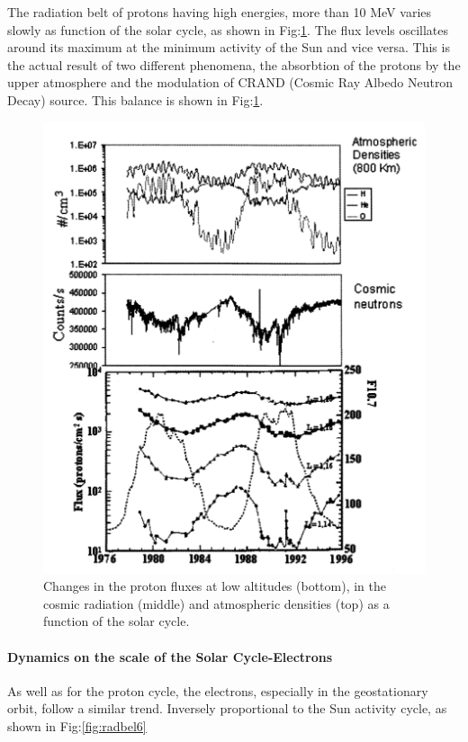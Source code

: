 \documentclass[./dissertation.tex]{subfiles}
\begin{document}
The radiation belt of protons having high energies, more than 10 MeV varies slowly as function of the solar cycle, as shown in Fig:\ref{fig:radbel5}. The flux levels oscillates around its maximum at the minimum activity of the Sun and vice versa. This is the actual result of two different phenomena, the absorbtion of the protons by the upper atmosphere and the modulation of CRAND (Cosmic Ray Albedo Neutron Decay) source. This balance is shown in Fig:\ref{fig:radbel5}.



\begin{figure}[h!]
\centering
  \includegraphics[scale = 0.50]{imgs/radbelt5.png}
  \caption{Changes in the proton fluxes at low altitudes (bottom), in the cosmic radiation (middle) and atmospheric densities (top) as a function of the solar cycle. \cite{bib2}}
  \label{fig:radbel5}
\end{figure}

\paragraph{Dynamics on the scale of the Solar Cycle-Electrons}
As well as for the proton cycle, the electrons, especially in the geostationary orbit, follow a similar trend. Inversely proportional to the Sun activity cycle, as shown in Fig:\ref{fig:radbel6}
\end{document}
